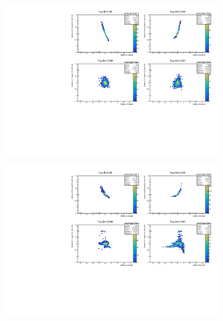 \begin{figure}[H]
\includegraphics[width=\textwidth]{plots/diffx/instab/linearfx/instabilities_mjj_QCD_Mgraph_Signal_Sh2211_BSMCQCDSTATS_linearfx_newbinning_madgraphasimov_bin3.pdf}
\end{figure}
\begin{figure}[H]
\includegraphics[width=\textwidth]{plots/diffx/instab/linearfx/instabilities_mjj_QCD_Mgraph_Signal_Sh2211_BSMCQCDSTATS_linearfx_newbinning_madgraphasimov_bin4.pdf}
\end{figure}

